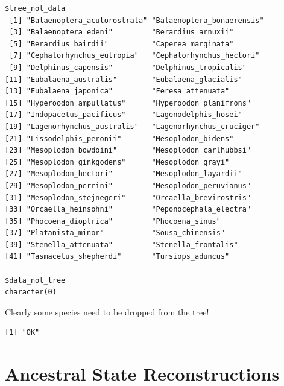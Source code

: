\documentclass[
]{book}
\newenvironment{Shaded}{\begin{snugshade}}{\end{snugshade}}
\newcommand{\KeywordTok}[1]{\textcolor[rgb]{0.13,0.29,0.53}{\textbf{#1}}}
\newcommand{\NormalTok}[1]{#1}
\newcommand{\OperatorTok}[1]{\textcolor[rgb]{0.81,0.36,0.00}{\textbf{#1}}}
\newcommand{\StringTok}[1]{\textcolor[rgb]{0.31,0.60,0.02}{#1}}
\begin{document}
\begin{verbatim}
$tree_not_data
 [1] "Balaenoptera_acutorostrata" "Balaenoptera_bonaerensis"  
 [3] "Balaenoptera_edeni"         "Berardius_arnuxii"         
 [5] "Berardius_bairdii"          "Caperea_marginata"         
 [7] "Cephalorhynchus_eutropia"   "Cephalorhynchus_hectori"   
 [9] "Delphinus_capensis"         "Delphinus_tropicalis"      
[11] "Eubalaena_australis"        "Eubalaena_glacialis"       
[13] "Eubalaena_japonica"         "Feresa_attenuata"          
[15] "Hyperoodon_ampullatus"      "Hyperoodon_planifrons"     
[17] "Indopacetus_pacificus"      "Lagenodelphis_hosei"       
[19] "Lagenorhynchus_australis"   "Lagenorhynchus_cruciger"   
[21] "Lissodelphis_peronii"       "Mesoplodon_bidens"         
[23] "Mesoplodon_bowdoini"        "Mesoplodon_carlhubbsi"     
[25] "Mesoplodon_ginkgodens"      "Mesoplodon_grayi"          
[27] "Mesoplodon_hectori"         "Mesoplodon_layardii"       
[29] "Mesoplodon_perrini"         "Mesoplodon_peruvianus"     
[31] "Mesoplodon_stejnegeri"      "Orcaella_brevirostris"     
[33] "Orcaella_heinsohni"         "Peponocephala_electra"     
[35] "Phocoena_dioptrica"         "Phocoena_sinus"            
[37] "Platanista_minor"           "Sousa_chinensis"           
[39] "Stenella_attenuata"         "Stenella_frontalis"        
[41] "Tasmacetus_shepherdi"       "Tursiops_aduncus"          

$data_not_tree
character(0)
\end{verbatim}

Clearly some species need to be dropped from the tree!

\begin{Shaded}
\end{Shaded}

\begin{verbatim}
[1] "OK"
\end{verbatim}

\hypertarget{ancestral-state-reconstructions}{%
\section{Ancestral State Reconstructions}\label{ancestral-state-reconstructions}}
\end{document}
